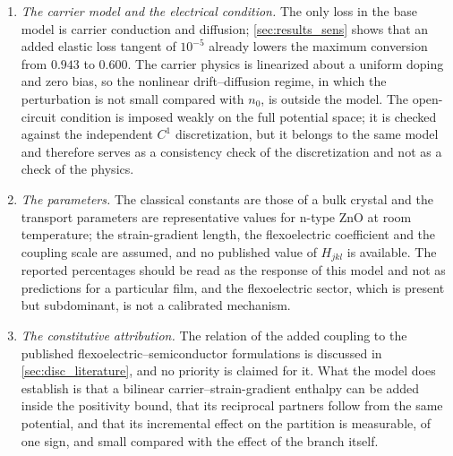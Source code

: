 \begin{enumerate}
scattering result does not rest on it.  The same holds for the traction itself: the weak
form of the edge condition closes to machine precision, but the pointwise traction is not identically zero.  At the
operating point its normalized norm away from the corners is $4.3\times10^{-2}$ at degree 10 and
$3.6\times10^{-2}$ at degree 28, while its maximum over the edge, which sits at the corners,
grows from $0.77$ to $2.4$ over the same range.  The free edge is therefore satisfied in the weak sense,
and a two-dimensional $x$--$z$ discretization that resolves the corner is the natural next check and is left for future work.  The same measurements settle what the
earlier band-energy argument could not: the strain-gradient energy in the outer
band $|z|>0.4\,d/2$ is $0.93$--$1.00$~\% of the total at the operating point,
$1.22$--$1.30$~\% at the maximum and $1.18$--$1.26$~\% at $k_xd=0.55$, and its
share decreases with degree, but the band average of the mixed hyperstress
exceeds the pointwise corner value by factors of five to ten, so no band average
is used here to argue the corner datum away.
\item \emph{The carrier model and the electrical condition.}  The only loss in the base model
is carrier conduction and diffusion; \cref{sec:results_sens} shows that an added
elastic loss tangent of $10^{-5}$ already lowers the maximum conversion from $0.943$ to $0.600$.  The carrier
physics is linearized about a uniform doping and zero bias, so the nonlinear
drift--diffusion regime, in which the perturbation is not small compared with
$n_0$, is outside the model.  The open-circuit condition is imposed weakly on the full potential space; it
is checked against the independent $C^{1}$ discretization, but it belongs to the same model and therefore serves as a consistency check of the discretization and not as a check of the physics.
\item \emph{The parameters.}  The classical constants are those of a bulk
crystal and the transport parameters are representative values for n-type ZnO at
room temperature; the strain-gradient length, the flexoelectric coefficient and
the coupling scale are assumed, and no published value of $H_{jkl}$ is available.
The reported percentages should be read as the response of this model
and not as predictions for a particular film, and the flexoelectric sector, which
is present but subdominant, is not a calibrated
mechanism.
\item \emph{The constitutive attribution.}  The relation of the added coupling
to the published flexoelectric--semiconductor formulations is discussed in \cref{sec:disc_literature}, and no priority is claimed for it.  What the
model does establish is that a bilinear carrier--strain-gradient enthalpy can be
added inside the positivity bound, that its reciprocal partners follow from the
same potential, and that its incremental effect on the partition is measurable,
of one sign, and small compared with the effect of the branch itself.
\end{enumerate}
